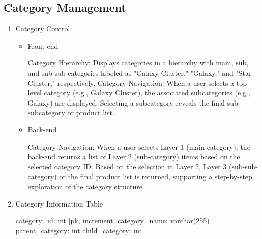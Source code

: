 \documentclass[conference]{IEEEtran}
\begin{document}
\subsection{Category Management}

\begin{enumerate}
\setlength{\parindent}{2ex}
\item Category Control
\begin{itemize}
\setlength{\parindent}{2ex}
\item Front-end

Category Hierarchy: Displays categories in a hierarchy with main, sub, and sub-sub categories labeled as "Galaxy Cluster," "Galaxy," and "Star Cluster," respectively. \newline\hspace*{1.2ex}
Category Navigation: When a user selects a top-level category (e.g., Galaxy Cluster), the associated subcategories (e.g., Galaxy) are displayed. Selecting a subcategory reveals the final sub-subcategory or product list.

\item Back-end

Category Navigation: When a user selects Layer 1 (main category), the back-end returns a list of Layer 2 (sub-category) items based on the selected category ID. Based on the selection in Layer 2, Layer 3 (sub-sub-category) or the final product list is returned, supporting a step-by-step exploration of the category structure.

\end{itemize}

\item Category Information Table

category\_id: int [pk, increment] \newline\hspace*{1.2ex}
category\_name: varchar(255) \newline\hspace*{1.2ex}        
parent\_category: int \newline\hspace*{1.2ex}
child\_category: int 

\hspace{0.5em}{\scriptsize Table attribute can be changed in development.}

\end{enumerate}
\end{document}
